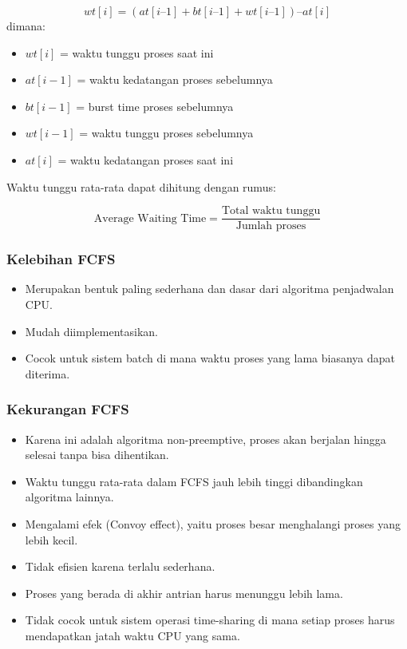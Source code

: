 \documentclass[12pt]{article}
\begin{document}
	\[
	wt[i] = (at[i–1] + bt[i–1] + wt[i–1]) – at[i]
	\]
	dimana:
	\begin{itemize}
		\item $wt[i]$ = waktu tunggu proses saat ini
		\item $at[i-1]$ = waktu kedatangan proses sebelumnya
		\item $bt[i-1]$ = burst time proses sebelumnya
		\item $wt[i-1]$ = waktu tunggu proses sebelumnya
		\item $at[i]$ = waktu kedatangan proses saat ini
	\end{itemize}
	
	Waktu tunggu rata-rata dapat dihitung dengan rumus:
	
	\[
	\text{Average Waiting Time} = \frac{\text{Total waktu tunggu}}{\text{Jumlah proses}}
	\]
	
	\subsubsection*{Kelebihan FCFS}
	\begin{itemize}
		\item Merupakan bentuk paling sederhana dan dasar dari algoritma penjadwalan CPU.
		\item Mudah diimplementasikan.
		\item Cocok untuk sistem batch di mana waktu proses yang lama biasanya dapat diterima.
	\end{itemize}
	
	\subsubsection*{Kekurangan FCFS}
	\begin{itemize}
		\item Karena ini adalah algoritma non-preemptive, proses akan berjalan hingga selesai tanpa bisa dihentikan.
		\item Waktu tunggu rata-rata dalam FCFS jauh lebih tinggi dibandingkan algoritma lainnya.
		\item Mengalami efek (Convoy effect), yaitu proses besar menghalangi proses yang lebih kecil.
		\item Tidak efisien karena terlalu sederhana.		
		\item Proses yang berada di akhir antrian harus menunggu lebih lama.		
		\item Tidak cocok untuk sistem operasi time-sharing di mana setiap proses harus mendapatkan jatah waktu CPU yang sama.	
	\end{itemize}
	
\end{document}
